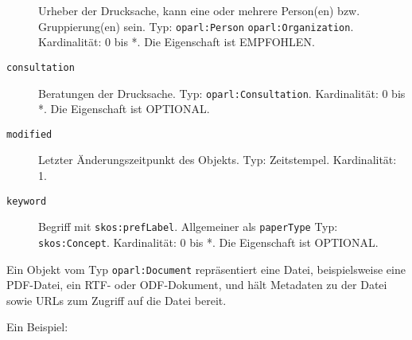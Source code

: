 \documentclass[,a4paper]{article}
\begin{document}
\begin{description}
Urheber der Drucksache, kann eine oder mehrere Person(en) bzw.
Gruppierung(en) sein. Typ: \texttt{oparl:Person} \textbar{}
\texttt{oparl:Organization}. Kardinalität: 0 bis *. Die Eigenschaft ist
EMPFOHLEN.
\item[\texttt{consultation}]
Beratungen der Drucksache. Typ: \texttt{oparl:Consultation}.
Kardinalität: 0 bis *. Die Eigenschaft ist OPTIONAL.
\item[\texttt{modified}]
Letzter Änderungszeitpunkt des Objekts. Typ: Zeitstempel. Kardinalität:
1.
\item[\texttt{keyword}]
Begriff mit \texttt{skos:prefLabel}. Allgemeiner als \texttt{paperType}
Typ: \texttt{skos:Concept}. Kardinalität: 0 bis *. Die Eigenschaft ist
OPTIONAL.
\end{description}


Ein Objekt vom Typ \texttt{oparl:Document} repräsentiert eine Datei,
beispielsweise eine PDF-Datei, ein RTF- oder ODF-Dokument, und hält
Metadaten zu der Datei sowie URLs zum Zugriff auf die Datei bereit.

Ein Beispiel:
\end{document}

